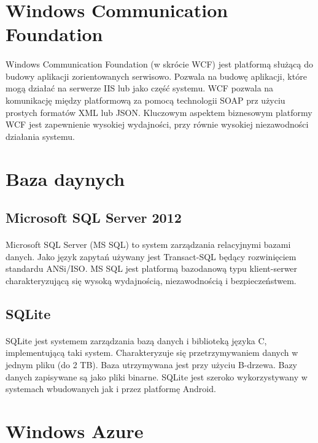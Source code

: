 \section{ Windows Communication Foundation }
\paragraph{}
Windows Communication Foundation (w skrócie WCF) jest platformą służącą do budowy aplikacji zorientowanych serwisowo. Pozwala na budowę aplikacji, które mogą działać na serwerze IIS lub jako część systemu. WCF pozwala na komunikację między platformową za pomocą technologii SOAP prz użyciu prostych formatów XML lub JSON. Kluczowym aspektem biznesowym platformy WCF jest zapewnienie wysokiej wydajności, przy równie wysokiej niezawodności działania systemu.

\section{Baza daynych}

\subsection{Microsoft SQL Server 2012}
\label{sub:mssql}
\paragraph{}
Microsoft SQL Server (MS SQL) to system zarządzania relacyjnymi bazami danych. Jako język zapytań używany jest Transact-SQL będący rozwinięciem standardu ANSi/ISO. MS SQL jest platformą bazodanową typu klient-serwer charakteryzującą się wysoką wydajnością, niezawodnością i bezpieczeństwem.

\subsection{SQLite} %
\paragraph{} %
SQLite jest systemem zarządzania bazą danych i biblioteką języka C, implementującą taki system. Charakteryzuje się przetrzymywaniem danych w jednym pliku (do 2 TB). Baza utrzymywana jest przy użyciu B-drzewa. Bazy danych zapisywane są jako pliki binarne. SQLite jest szeroko wykorzystywany w systemach wbudowanych jak i przez platformę Android.

\section{Windows Azure} %

